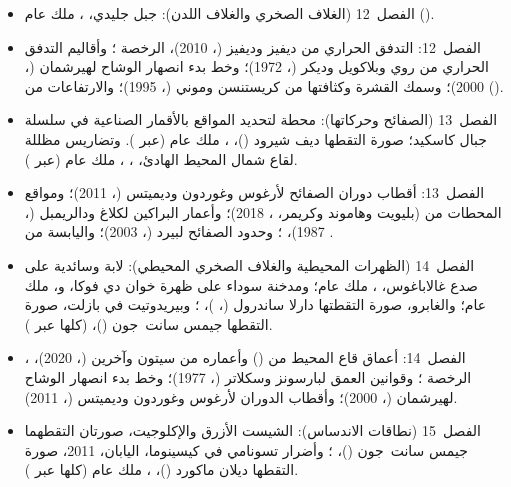 \begin{itemize}
  \item الفصل~12 (الغلاف الصخري والغلاف اللدن): جبل جليدي، ، ملك عام ().
  \item الفصل~12: التدفق الحراري من ديفيز وديفيز (، 2010)، الرخصة ؛ وأقاليم التدفق الحراري من روي وبلاكويل وديكر (، 1972)؛ وخط بدء انصهار الوشاح لهيرشمان (، 2000)؛ وسمك القشرة وكثافتها من كريستنسن وموني (، 1995)؛ والارتفاعات من  ().
  \item الفصل~13 (الصفائح وحركاتها): محطة لتحديد المواقع بالأقمار الصناعية في سلسلة جبال كاسكيد؛ صورة التقطها ديف شيرود ()، ، ملك عام (عبر ). وتضاريس مظللة لقاع شمال المحيط الهادئ، ، ، ملك عام (عبر ).
  \item الفصل~13: أقطاب دوران الصفائح  لأرغوس وغوردون وديميتس (، 2011)؛ ومواقع المحطات من  (بليويت وهاموند وكريمر، ، 2018)؛ وأعمار البراكين لكلاغ ودالريمبل (، 1987)، ؛ وحدود الصفائح لبيرد (، 2003)؛ واليابسة من .
  \item الفصل~14 (الظهرات المحيطية والغلاف الصخري المحيطي): لابة وسائدية على صدع غالاباغوس، ، ملك عام؛ ومدخنة سوداء على ظهرة خوان دي فوكا،  و، ملك عام؛ والغابرو، صورة التقطتها دارلا ساندرول (، )، ؛ وبيريدوتيت في بازلت، صورة التقطها جيمس سانت~جون ()،  (كلها عبر ).
  \item الفصل~14: أعماق قاع المحيط من  () وأعماره من سيتون وآخرين (، 2020)، ، الرخصة ؛ وقوانين العمق لبارسونز وسكلاتر (، 1977)؛ وخط بدء انصهار الوشاح لهيرشمان (، 2000)؛ وأقطاب الدوران  لأرغوس وغوردون وديميتس (، 2011).
  \item الفصل~15 (نطاقات الاندساس): الشيست الأزرق والإكلوجيت، صورتان التقطهما جيمس سانت~جون ()، ؛ وأضرار تسونامي في كيسينوما، اليابان، 2011، صورة التقطها ديلان ماكورد ()، ، ملك عام (كلها عبر ).

\end{itemize}
